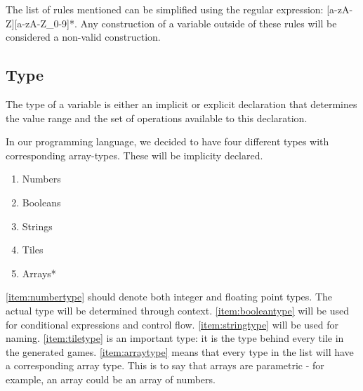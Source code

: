The list of rules mentioned can be simplified using the regular expression: [a-zA-Z][a-zA-Z_0-9]*. Any construction of a variable outside of these rules will be considered
a non-valid construction.

\subsection{Type}

The type of a variable is either an implicit or explicit declaration that determines the value range and the set of operations available to this declaration.

In our programming language, we decided to have four different types with corresponding array-types. These will be implicity declared.

\begin{multicols}{3}
\begin{enumerate}
    \item Numbers\label{item:numbertype}
    \item Booleans\label{item:booleantype}
    \item Strings\label{item:stringtype}
    \item Tiles\label{item:tiletype}
    \item Arrays*\label{item:arraytype}
\end{enumerate}
\end{multicols}

\ref{item:numbertype} should denote both integer and floating point types. The actual type will be determined through context. \ref{item:booleantype} will be used for conditional expressions and control flow.
\ref{item:stringtype} will be used for naming.
\ref{item:tiletype} is an important type: it is the type behind every tile in the generated games.
\ref{item:arraytype} means that every type in the list will have a corresponding array type. This is to say that arrays are parametric - for example, an array could be an array of numbers.
